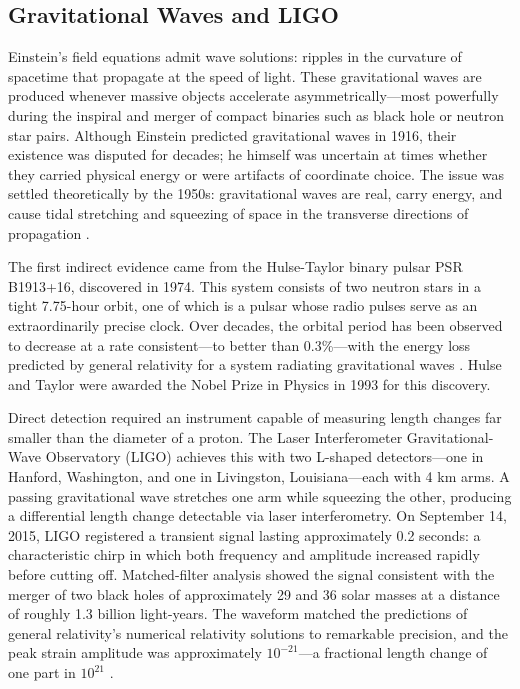 \documentclass[12pt, a4paper]{article}
\begin{document}
	\subsection{Gravitational Waves and LIGO}
	
	Einstein's field equations admit wave solutions: ripples in the curvature of spacetime that propagate at the speed of light. These gravitational waves are produced whenever massive objects accelerate asymmetrically—most powerfully during the inspiral and merger of compact binaries such as black hole or neutron star pairs. Although Einstein predicted gravitational waves in 1916, their existence was disputed for decades; he himself was uncertain at times whether they carried physical energy or were artifacts of coordinate choice. The issue was settled theoretically by the 1950s: gravitational waves are real, carry energy, and cause tidal stretching and squeezing of space in the transverse directions of propagation \citep{willConfrontationGeneralRelativity2014}.
	
	The first indirect evidence came from the Hulse-Taylor binary pulsar PSR B1913+16, discovered in 1974. This system consists of two neutron stars in a tight 7.75-hour orbit, one of which is a pulsar whose radio pulses serve as an extraordinarily precise clock. Over decades, the orbital period has been observed to decrease at a rate consistent—to better than 0.3\%—with the energy loss predicted by general relativity for a system radiating gravitational waves \citep{willConfrontationGeneralRelativity2014}. Hulse and Taylor were awarded the Nobel Prize in Physics in 1993 for this discovery.
	
	Direct detection required an instrument capable of measuring length changes far smaller than the diameter of a proton. The Laser Interferometer Gravitational-Wave Observatory (LIGO) achieves this with two L-shaped detectors—one in Hanford, Washington, and one in Livingston, Louisiana—each with 4 km arms. A passing gravitational wave stretches one arm while squeezing the other, producing a differential length change detectable via laser interferometry. On September 14, 2015, LIGO registered a transient signal lasting approximately 0.2 seconds: a characteristic chirp in which both frequency and amplitude increased rapidly before cutting off. Matched-filter analysis showed the signal consistent with the merger of two black holes of approximately 29 and 36 solar masses at a distance of roughly 1.3 billion light-years. The waveform matched the predictions of general relativity's numerical relativity solutions to remarkable precision, and the peak strain amplitude was approximately \(10^{-21}\)—a fractional length change of one part in \(10^{21}\) \citep{willConfrontationGeneralRelativity2014}.
	
\end{document}

